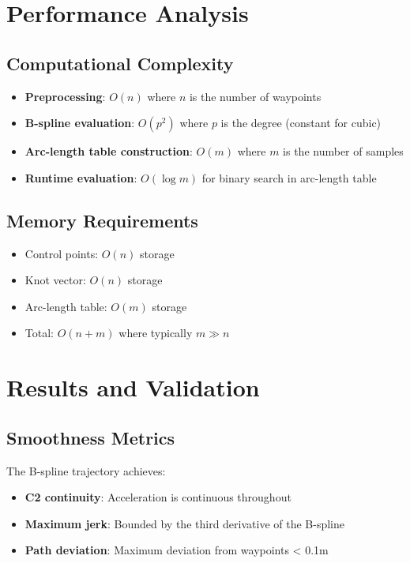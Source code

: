 \documentclass[11pt]{article}
\begin{document}
\section{Performance Analysis}

\subsection{Computational Complexity}

\begin{itemize}
    \item \textbf{Preprocessing}: $O(n)$ where $n$ is the number of waypoints
    \item \textbf{B-spline evaluation}: $O(p^2)$ where $p$ is the degree (constant for cubic)
    \item \textbf{Arc-length table construction}: $O(m)$ where $m$ is the number of samples
    \item \textbf{Runtime evaluation}: $O(\log m)$ for binary search in arc-length table
\end{itemize}

\subsection{Memory Requirements}

\begin{itemize}
    \item Control points: $O(n)$ storage
    \item Knot vector: $O(n)$ storage
    \item Arc-length table: $O(m)$ storage
    \item Total: $O(n + m)$ where typically $m \gg n$
\end{itemize}

\section{Results and Validation}

\subsection{Smoothness Metrics}

The B-spline trajectory achieves:

\begin{itemize}
    \item \textbf{C2 continuity}: Acceleration is continuous throughout
    \item \textbf{Maximum jerk}: Bounded by the third derivative of the B-spline
    \item \textbf{Path deviation}: Maximum deviation from waypoints < 0.1m
\end{itemize}
\end{document}
